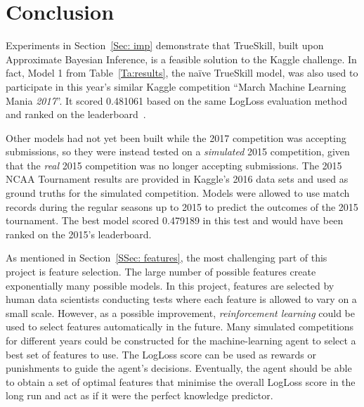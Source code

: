 \chapter{Conclusion}\label{Chap:4}

Experiments in Section~\ref{Sec: imp} demonstrate that TrueSkill, built upon Approximate Bayesian Inference, is a feasible solution to the Kaggle challenge. In fact, Model 1 from Table~\ref{Ta:results}, the na\"{i}ve TrueSkill model, was also used to participate in this year's similar Kaggle competition ``March Machine Learning Mania \emph{2017}''. It scored 0.481061 based on the same LogLoss evaluation method and ranked  on the leaderboard~\cite{KG17}. 

Other models had not yet been built while the 2017 competition was accepting submissions, so they were instead tested on a \emph{simulated} 2015 competition, given that the \emph{real} 2015 competition was no longer accepting submissions. The 2015 NCAA Tournament results are provided in Kaggle's 2016 data sets and used as ground truths for the simulated competition. Models were allowed to use match records during the regular seasons up to 2015 to predict the outcomes of the 2015 tournament. The best model scored 0.479189 in this test and would have been ranked  on the 2015's leaderboard. 

As mentioned in Section~\ref{SSec: features}, the most challenging part of this project is feature selection. The large number of possible features create exponentially many possible models. In this project, features are selected by human data scientists conducting tests where each feature is allowed to vary on a small scale. However, as a possible improvement, \emph{reinforcement learning} could be used to select features automatically in the future. Many simulated competitions for different years could be constructed for the machine-learning agent to select a best set of features to use. The LogLoss score can be used as rewards or punishments to guide the agent's decisions. Eventually, the agent should be able to obtain a set of optimal features that minimise the overall LogLoss score in the long run and act as if it were the perfect knowledge predictor. 